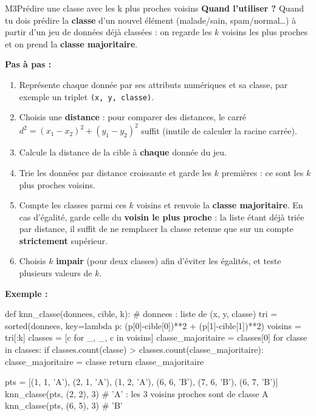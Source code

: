\begin{fichemethode}{M3}{Prédire une classe avec les k plus proches voisins}
\textbf{Quand l'utiliser ?} Quand tu dois prédire la \textbf{classe} d'un nouvel élément (malade/sain, spam/normal\ldots) à partir d'un jeu de données déjà classées : on regarde les $k$ voisins les plus proches et on prend la \textbf{classe majoritaire}.

\textbf{Pas à pas :}
\begin{enumerate}
  \item Représente chaque donnée par ses attributs numériques et sa classe, par exemple un triplet \lstinline{(x, y, classe)}.
  \item Choisis une \textbf{distance} : pour comparer des distances, le carré
    $d^2 = (x_1-x_2)^2 + (y_1-y_2)^2$ suffit (inutile de calculer la racine carrée).
  \item Calcule la distance de la cible à \textbf{chaque} donnée du jeu.
  \item Trie les données par distance croissante et garde les $k$ premières : ce sont les $k$ plus proches voisins.
  \item Compte les classes parmi ces $k$ voisins et renvoie la \textbf{classe majoritaire}. En cas d'égalité, garde celle du \textbf{voisin le plus proche} : la liste étant déjà triée par distance, il suffit de ne remplacer la classe retenue que sur un compte \textbf{strictement} supérieur.
  \item Choisis $k$ \textbf{impair} (pour deux classes) afin d'éviter les égalités, et teste plusieurs valeurs de $k$.
\end{enumerate}

\textbf{Exemple :}
\begin{python}
def knn_classe(donnees, cible, k):
    # donnees : liste de (x, y, classe)
    tri = sorted(donnees,
                 key=lambda p: (p[0]-cible[0])**2 + (p[1]-cible[1])**2)
    voisins = tri[:k]
    classes = [c for _, _, c in voisins]
    classe_majoritaire = classes[0]
    for classe in classes:
        if classes.count(classe) > classes.count(classe_majoritaire):
            classe_majoritaire = classe
    return classe_majoritaire

pts = [(1, 1, 'A'), (2, 1, 'A'), (1, 2, 'A'),
       (6, 6, 'B'), (7, 6, 'B'), (6, 7, 'B')]
knn_classe(pts, (2, 2), 3)   # 'A' : les 3 voisins proches sont de classe A
knn_classe(pts, (6, 5), 3)   # 'B'
\end{python}


\end{fichemethode}
